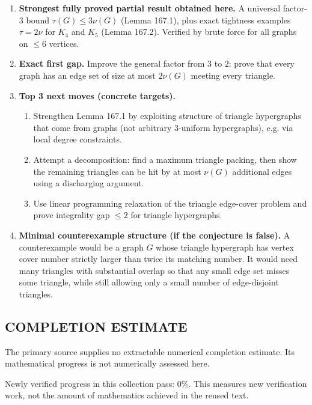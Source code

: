 \begin{enumerate}
\item[(i)] \textbf{Strongest fully proved partial result obtained here.}
A universal factor-$3$ bound $\tau(G)\le 3\nu(G)$ (Lemma 167.1), plus exact tightness examples $\tau=2\nu$ for $K_4$ and $K_5$ (Lemma 167.2). Verified by brute force for all graphs on $\le 6$ vertices.

\item[(ii)] \textbf{Exact first gap.}
Improve the general factor from $3$ to $2$: prove that every graph has an edge set of size at most $2\nu(G)$ meeting every triangle.

\item[(iii)] \textbf{Top 3 next moves (concrete targets).}
\begin{enumerate}
\item Strengthen Lemma 167.1 by exploiting structure of triangle hypergraphs that come from graphs (not arbitrary $3$-uniform hypergraphs), e.g. via local degree constraints.
\item Attempt a decomposition: find a maximum triangle packing, then show the remaining triangles can be hit by at most $\nu(G)$ additional edges using a discharging argument.
\item Use linear programming relaxation of the triangle edge-cover problem and prove integrality gap $\le 2$ for triangle hypergraphs.
\end{enumerate}

\item[(iv)] \textbf{Minimal counterexample structure (if the conjecture is false).}
A counterexample would be a graph $G$ whose triangle hypergraph has vertex cover number strictly larger than twice its matching number. It would need many triangles with substantial overlap so that any small edge set misses some triangle, while still allowing only a small number of edge-disjoint triangles.
\end{enumerate}


\subsection*{COMPLETION ESTIMATE}
The primary source supplies no extractable numerical completion estimate. Its mathematical progress is not numerically assessed here.

Newly verified progress in this collection pass: $0\%$. This measures new verification work, not the amount of mathematics achieved in the reused text.

